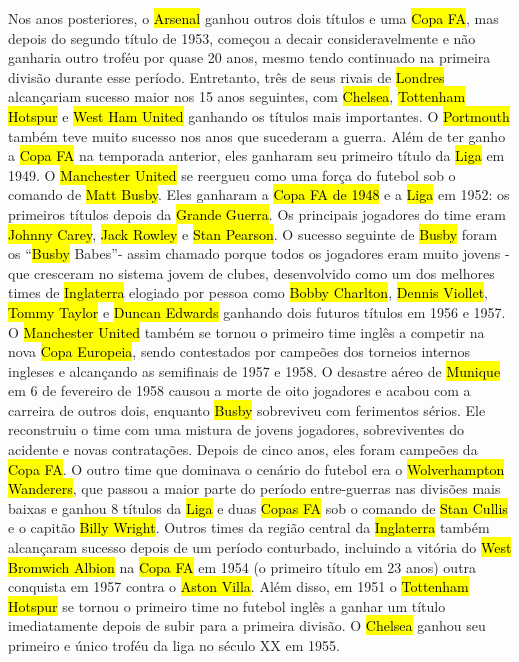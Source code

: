 \documentclass[a4paper,12pt]{article}
\begin{document}
Nos anos posteriores, o \hl{Arsenal} ganhou outros dois títulos e uma \hl{Copa FA}, mas depois do segundo título de 1953, começou a decair consideravelmente e não ganharia outro troféu por quase 20 anos, mesmo tendo continuado na primeira divisão durante esse período. Entretanto, três de seus rivais de \hl{Londres} alcançariam sucesso maior nos 15 anos seguintes, com \hl{Chelsea}, \hl{Tottenham Hotspur} e \hl{West Ham United} ganhando os títulos mais importantes.
O \hl{Portmouth} também teve muito sucesso nos anos que sucederam a guerra. Além de ter ganho a \hl{Copa FA} na temporada anterior, eles ganharam seu primeiro título da \hl{Liga} em 1949.
O \hl{Manchester United} se reergueu como uma força do futebol sob o comando de \hl{Matt Busby}. Eles ganharam a \hl{Copa FA de 1948} e a \hl{Liga} em 1952: os primeiros títulos depois da \hl{Grande Guerra}. Os principais jogadores do time eram \hl{Johnny Carey}, \hl{Jack Rowley} e \hl{Stan Pearson}. O sucesso seguinte de \hl{Busby} foram os “\hl{Busby} Babes”- assim chamado porque todos os jogadores eram muito jovens - que cresceram no sistema jovem de clubes, desenvolvido como um dos melhores times de \hl{Inglaterra} elogiado por pessoa como \hl{Bobby Charlton}, \hl{Dennis Viollet}, \hl{Tommy Taylor} e \hl{Duncan Edwards} ganhando dois futuros títulos em 1956 e 1957. O \hl{Manchester United} também se tornou o primeiro time inglês a competir na nova \hl{Copa Europeia}, sendo contestados por campeões dos torneios internos ingleses e alcançando as semifinais de 1957 e 1958.
O desastre aéreo de \hl{Munique} em 6 de fevereiro de 1958 causou a morte de oito jogadores e acabou com a carreira de outros dois, enquanto \hl{Busby} sobreviveu com ferimentos sérios. Ele reconstruiu o time com uma mistura de jovens jogadores, sobreviventes do acidente e novas contratações. Depois de cinco anos, eles foram campeões da \hl{Copa FA}.
O outro time que dominava o cenário do futebol era o \hl{Wolverhampton Wanderers}, que passou a maior parte do período entre-guerras nas divisões mais baixas e ganhou 8 títulos da \hl{Liga} e duas \hl{Copas FA} sob o comando de \hl{Stan Cullis} e o capitão \hl{Billy Wright}. Outros times da região central da \hl{Inglaterra} também alcançaram sucesso depois de um período conturbado, incluindo a vitória do \hl{West Bromwich Albion} na \hl{Copa FA} em 1954 (o primeiro título em 23 anos) outra conquista em 1957 contra o \hl{Aston Villa}.
Além disso, em 1951 o \hl{Tottenham Hotspur} se tornou o primeiro time no futebol inglês a ganhar um título imediatamente depois de subir para a primeira divisão. O \hl{Chelsea} ganhou seu primeiro e único troféu da liga no século XX em 1955.
\end{document}
